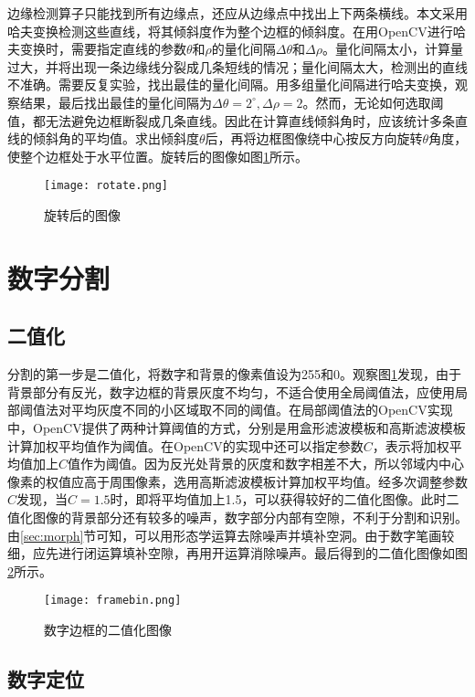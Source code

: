 边缘检测算子只能找到所有边缘点，还应从边缘点中找出上下两条横线。本文采用哈夫变换检测这些直线，将其倾斜度作为整个边框的倾斜度。在用OpenCV进行哈夫变换时，需要指定直线的参数$\theta$和$\rho$的量化间隔$\Delta\theta$和$\Delta\rho$。量化间隔太小，计算量过大，并将出现一条边缘线分裂成几条短线的情况；量化间隔太大，检测出的直线不准确。需要反复实验，找出最佳的量化间隔。用多组量化间隔进行哈夫变换，观察结果，最后找出最佳的量化间隔为$\Delta\theta=2^\circ,\Delta\rho=2$。然而，无论如何选取阈值，都无法避免边框断裂成几条直线。因此在计算直线倾斜角时，应该统计多条直线的倾斜角的平均值。求出倾斜度$\theta$后，再将边框图像绕中心按反方向旋转$\theta$角度，使整个边框处于水平位置。旋转后的图像如图\ref{fig:rotate}所示。
\begin{figure}[h]
  \centering
  \texttt{[image: rotate.png]}
  \caption{旋转后的图像}
  \label{fig:rotate}
\end{figure}

\section{数字分割}

\subsection{二值化}


分割的第一步是二值化，将数字和背景的像素值设为255和0。观察图\ref{fig:rotate}发现，由于背景部分有反光，数字边框的背景灰度不均匀，不适合使用全局阈值法，应使用局部阈值法对平均灰度不同的小区域取不同的阈值。在局部阈值法的OpenCV实现中，OpenCV提供了两种计算阈值的方式，分别是用盒形滤波模板和高斯滤波模板计算加权平均值作为阈值。在OpenCV的实现中还可以指定参数$C$，表示将加权平均值加上$C$值作为阈值。因为反光处背景的灰度和数字相差不大，所以邻域内中心像素的权值应高于周围像素，选用高斯滤波模板计算加权平均值。经多次调整参数$C$发现，当$C=1.5$时，即将平均值加上1.5，可以获得较好的二值化图像。此时二值化图像的背景部分还有较多的噪声，数字部分内部有空隙，不利于分割和识别。由\ref{sec:morph}节可知，可以用形态学运算去除噪声并填补空洞。由于数字笔画较细，应先进行闭运算填补空隙，再用开运算消除噪声。最后得到的二值化图像如图\ref{fig:framebin}所示。
\begin{figure}[h]
  \centering
  \texttt{[image: framebin.png]}
  \caption{数字边框的二值化图像}
  \label{fig:framebin}
\end{figure}

\subsection{数字定位}


